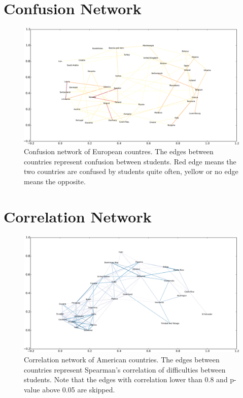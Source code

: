 \section{Confusion Network}

\begin{figure}[htbp]
  \centering
  \includegraphics[width=\textwidth]{img/graph-confusion-european-countries}
  \caption{Confusion network of European countres. The edges between countries represent confusion between students. Red edge means the two countries are confused by students quite often, yellow or no edge means the opposite.}
  \label{fig-confusion-european-countries}
\end{figure}

\section{Correlation Network}

\begin{figure}[htbp]
  \centering
  \includegraphics[width=\textwidth]{img/graph-correlation-american-countries}
  \caption{Correlation network of American countries. The edges between countries represent Spearman's correlation of difficulties between students. Note that the edges with correlation lower than 0.8 and p-value above 0.05 are skipped.}
  \label{fig-correlation-american-countries}
\end{figure}

